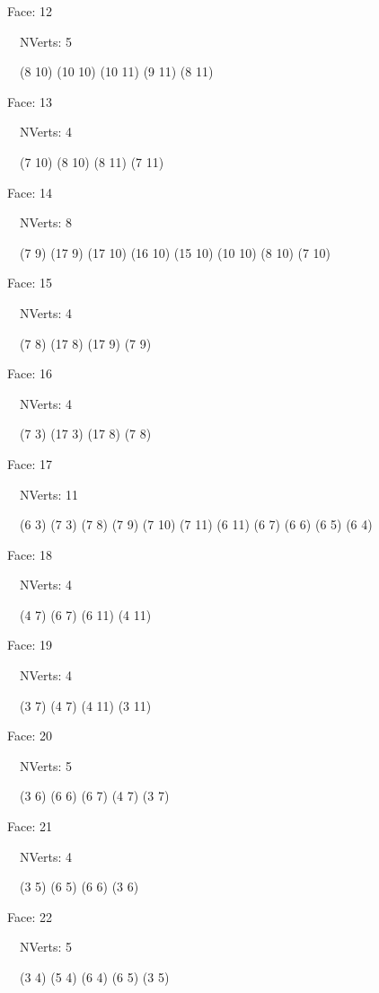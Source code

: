 \documentclass{article}
\begin{document}
{\footnotesize 

Face: 12

\   \    NVerts: 5

 \   \   (8 10) (10 10) (10 11) (9 11) (8 11)}

{\footnotesize 

Face: 13

\   \    NVerts: 4

 \   \   (7 10) (8 10) (8 11) (7 11)}

{\footnotesize 

Face: 14

\   \    NVerts: 8

 \   \   (7 9) (17 9) (17 10) (16 10) (15 10) (10 10) (8 10) (7 10)}

{\footnotesize 

Face: 15

\   \    NVerts: 4

 \   \   (7 8) (17 8) (17 9) (7 9)}

{\footnotesize 

Face: 16

\   \    NVerts: 4

 \   \   (7 3) (17 3) (17 8) (7 8)}

{\footnotesize 

Face: 17

\   \    NVerts: 11

 \   \   (6 3) (7 3) (7 8) (7 9) (7 10) (7 11) (6 11) (6 7) (6 6) (6 5) (6 4)}

{\footnotesize 

Face: 18

\   \    NVerts: 4

 \   \   (4 7) (6 7) (6 11) (4 11)}

{\footnotesize 

Face: 19

\   \    NVerts: 4

 \   \   (3 7) (4 7) (4 11) (3 11)}

{\footnotesize 

Face: 20

\   \    NVerts: 5

 \   \   (3 6) (6 6) (6 7) (4 7) (3 7)}

{\footnotesize 

Face: 21

\   \    NVerts: 4

 \   \   (3 5) (6 5) (6 6) (3 6)}

{\footnotesize 

Face: 22

\   \    NVerts: 5

 \   \   (3 4) (5 4) (6 4) (6 5) (3 5)}
\end{document}
